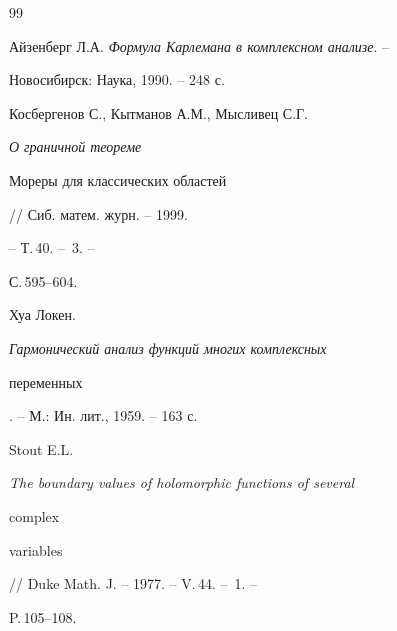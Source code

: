 \begin{thebibliography}{99}


Айзенберг Л.А. {\em Формула Карлемана в комплексном анализе}. -- 


Новосибирск: Наука, 1990. -- 248 с. 




Косбергенов С., Кытманов А.М., Мысливец С.Г. {\em О граничной теореме 


Мореры для классических областей} // Сиб. матем. журн. -- 1999. 


-- Т.\,40. -- \No\,3. -- 


С.\,595--604. 




Хуа Локен. {\em Гармонический анализ функций многих комплексных 


переменных}. -- М.: Ин. лит., 1959. -- 163 с. 




Stout E.L. {\em The boundary values of holomorphic functions of several 


complex 


variables} // Duke Math. J. -- 1977. -- V.\,44. -- \No\,1. -- 


P.\,105--108. 


 


\end{thebibliography} 


 


\vskip 2cm 


 






 


\label{end} 


 



